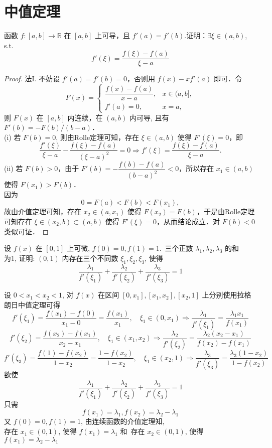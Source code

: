 \documentclass[color=green,titlestyle=hang]{elegantbook}%
\begin{document}
\chapter{中值定理}

\begin{exercise}
函数 $f:[a,b]\rightarrow\mathbb{R}$ 在 $[a,b]$ 上可导，且 $f'(a)=f'(b)$.证明：$\exists\xi\in(a,b)$, s.t.
\[f'(\xi)=\dfrac{f(\xi)-f(a)}{\xi-a}\]
\end{exercise}\begin{proof}
法I\textsuperscript{\cite{ZhouMingQiang2014}}. 不妨设 $f'(a)=f'(b)=0$，否则用 $f(x)-xf'(a)$ 即可．令
\[F(x)=\begin{cases} \dfrac{f(x)-f(a)}{x-a}, &x\in(a,b],\\ f'(a)=0, &x=a,\end{cases}\]
则 $F(x)$ 在 $[a,b]$ 内连续，在 $(a,b)$ 内可导, 且有 $F'(b)=-F(b)/(b-a)$．\\
(i) 若 $F(b)=0$, 则由Rolle定理可知，存在 $\xi\in(a,b)$ 使得 $F'(\xi)=0$，即
\[\frac{f'(\xi)}{\xi-a}-\frac{f(\xi)-f(a)}{(\xi-a)^2}=0\Rightarrow f'(\xi)=\frac{f(\xi)-f(a)}{\xi-a}.\]
(ii) 若 $F(b)>0$，由于 $F'(b)=-\dfrac{f(b)-f(a)}{(b-a)^2}<0$，所以存在 $x_1\in(a,b)$ 使得 $F(x_1)>F(b)$．\\
因为\[0=F(a)<F(b)<F(x_1),\]
故由介值定理可知，存在 $x_2\in(a,x_1)$ 使得 $F(x_2)=F(b)$，于是由Rolle定理可知存在 $\xi\in(x_2,b)\subset(a,b)$ 使得 $F'(\xi)=0$，从而结论成立．对 $F(b)<0$ 类似可证．
\end{proof}

\begin{exercise}设 $f(x)$ 在 $[0,1]$ 上可微, $f(0)=0,f(1)=1$.\, 三个正数 $\lambda_1,\lambda_2,\lambda_3$ 的和\\
为1,	证明: $(0,1)$ 内存在三个不同数  $\xi_1,\xi_2,\xi_3$, 使得\[\frac{\lambda_1}{f'(\xi_1)}+\frac{\lambda_2}{f'(\xi_2)}+\frac{\lambda_3}{f'(\xi_3)}=1\]
\end{exercise}\begin{newproof}
设 $0<x_1<x_2<1$, 对 $f(x)$ 在区间 $[0,x_1],[x_1,x_2],[x_2,1]$ 上分别使用拉格朗日中值定理可得
\[f'(\xi_1)=\frac{f(x_1)-f(0)}{x_1-0}=\frac{f(x_1)}{x_1},\quad \xi_1\in(0,x_1)\Longrightarrow\frac{\lambda_1}{f'(\xi_1)}=\frac{\lambda_1x_1}{f(x_1)}\]
\[f'(\xi_2)=\frac{f(x_2)-f(x_1)}{x_2-x_1},\quad \xi_1\in(x_1,x_2)\Longrightarrow\frac{\lambda_2}{f'(\xi_2)}=\frac{\lambda_2(x_2-x_1)}{f(x_2)-f(x_1)}\]
\[f'(\xi_3)=\frac{f(1)-f(x_2)}{1-x_2}=\frac{1-f(x_2)}{1-x_2},\quad \xi_1\in(x_2,1)\Longrightarrow\frac{\lambda_3}{f'(\xi_3)}=\frac{\lambda_3(1-x_2)}{1-f(x_2)}\]
欲使\[\frac{\lambda_1}{f'(\xi_1)}+\frac{\lambda_2}{f'(\xi_2)}+\frac{\lambda_3}{f'(\xi_3)}=1\]
只需\[f(x_1)=\lambda_1,f(x_2)=\lambda_2-\lambda_1\] 
又 $f(0)=0,f(1)=1$, 由连续函数的介值定理知,\\
存在 $x_1\in(0,1)$, 使得 $f(x_1)=\lambda_1$ 和\, 存在 $x_2\in(0,1)$, 使得 $f(x_1)=\lambda_2-\lambda_1$ 
\end{newproof}
\end{document}
